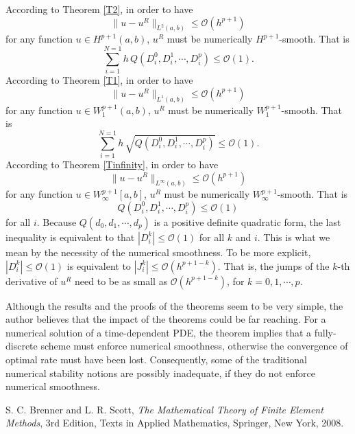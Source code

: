 \documentclass{article}
\numberwithin{equation}{section}
\begin{document}
\begin{spacing}{1.15}
According to Theorem \ref{T2}, in order to have
$$
\|u-u^R\|_{L^2(a,b)} \le {\mathcal O} (h^{p+1})
$$
for any function $u \in H^{p+1}(a,b)$, $u^R$ must be numerically $H^{p+1}$-smooth. That is
\begin{equation} \label{Hsmoothness}
\sum_{i=1}^{N=1} h\,  Q(D^0_i,D^1_i,\cdots,D^p_i) \le {\mathcal O}(1).
\end{equation}
According to Theorem \ref{T1}, in order to have
$$
\|u-u^R\|_{L^1(a,b)} \le {\mathcal O} (h^{p+1})
$$
for any function $u \in W^{p+1}_{1}(a,b)$, $u^R$ must be numerically
$W^{p+1}_{1}$-smooth. That is
\begin{equation} \label{Hsmoothness}
\sum_{i=1}^{N=1} h\, \sqrt{ Q(D^0_i,D^1_i,\cdots,D^p_i) } \le {\mathcal O}(1).
\end{equation}
According to Theorem \ref{Tinfinity}, in order to have
$$
\|u-u^R\|_{L^{\infty}(a,b)} \le {\mathcal O} (h^{p+1})
$$
for any function $u \in W^{p+1}_{\infty}[a,b]$, $u^R$ must be numerically $W^{p+1}_{\infty}$-smooth. That is
\begin{equation} \label{Csmoothness}
Q(D^0_i,D^1_i,\cdots,D^p_i) \le {\mathcal O}(1)
\end{equation}
for all $i$. Because $Q(d_0,d_1,\cdots,d_p)$ is a positive definite quadratic form, the last inequality is equivalent to that $|D^k_i| \le {\mathcal O}(1)$ for all $k$ and $i$. This is what we mean by the necessity of the numerical smoothness. To be more explicit, $|D^k_i| \le {\mathcal O}(1)$ is equivalent to $|J^k_i| \le {\mathcal O}(h^{p+1-k})$. That is, the jumps of the $k$-th derivative of $u^R$ need to be as small as ${\mathcal O}(h^{p+1-k})$, for $k=0,1,\cdots,p$.

Although the results and the proofs of the theorems seem to be very
simple, the author believes that the impact of the theorems could be
far reaching. For a numerical solution of a time-dependent PDE, the
theorem implies that a fully-discrete scheme must enforce numerical
smoothness, otherwise the convergence of optimal rate must have been
lost. Consequently, some of the traditional numerical stability
notions are possibly inadequate, if they do not enforce numerical
smoothness.


\begin{thebibliography}{10}

 S. C. Brenner and L. R. Scott,  {\em The Mathematical Theory of Finite Element Methods}, 
3rd Edition, Texts in Applied Mathematics, Springer, New York, 2008.


\end{thebibliography}
\end{spacing}
\end{document}
